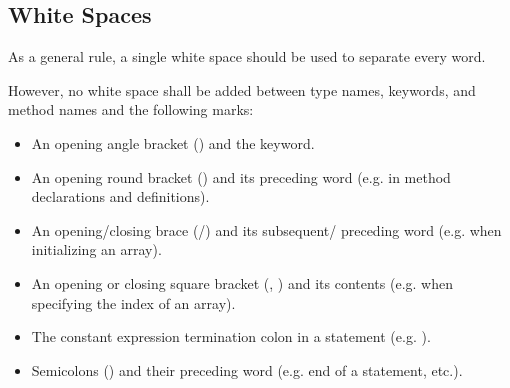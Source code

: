 \subsection{White Spaces}
\label{subsec:WhiteSpaces}

As a general rule, a single white space should be used to separate every word.

However, no white space shall be added between type names, keywords, and method
names and the following marks:
\begin{itemize}
\item An opening angle bracket (\code{<}) and the  keyword.
\item An opening round bracket (\code{(}) and its preceding word (e.g. in method
declarations and definitions).
\item An opening/closing brace (\code{\{}/\code{\}}) and its subsequent/
preceding word (e.g. when initializing an array).
\item An opening or closing square bracket (\code{[}, \code{]} ) and its
contents (e.g. when specifying the index of an array).
\item The constant expression termination colon in a  statement
(e.g. ).
\item Semicolons (\code{;}) and their preceding word (e.g. end of a statement,
etc.).
\end{itemize}

